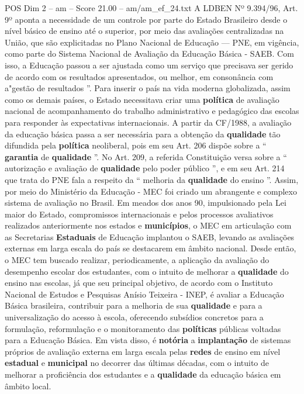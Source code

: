 \begin{textsample}{POS Dim 2 – am – Score 21.00 – am/am\_ef\_24.txt}
A LDBEN Nº 9.394/96, Art. 9º aponta a necessidade de um controle por parte do Estado Brasileiro desde o nível básico de ensino até o superior, por meio das avaliações centralizadas na União, que são explicitadas no Plano Nacional de Educação — PNE, em vigência, como parte do Sistema Nacional de Avaliação da Educação Básica - SAEB.
Com isso, a Educação passou a ser ajustada como um serviço que precisava ser gerido de acordo com os resultados apresentados, ou melhor, em consonância com a"gestão de resultados ”.
Para inserir o país na vida moderna globalizada, assim como os demais países, o Estado necessitava criar uma \textbf{política} de avaliação nacional de acompanhamento do trabalho administrativo e pedagógico das escolas para responder às expectativas internacionais.
A partir da CF/1988, a avaliação da educação básica passa a ser necessária para a obtenção da \textbf{qualidade} tão difundida pela \textbf{política} neoliberal, pois em seu Art. 206 dispõe sobre a “ \textbf{garantia} de \textbf{qualidade} ”.
No Art. 209, a referida Constituição versa sobre a “ autorização e avaliação de \textbf{qualidade} pelo poder público ”, e em seu Art. 214 que trata do PNE fala a respeito da “ melhoria da \textbf{qualidade} do ensino ”.
Assim, por meio do Ministério da Educação - MEC foi criado um abrangente e complexo sistema de avaliação no Brasil.
Em meados dos anos 90, impulsionado pela Lei maior do Estado, compromissos internacionais e pelos processos avaliativos realizados anteriormente nos estados e \textbf{municípios}, o MEC em articulação com as Secretarias \textbf{Estaduais} de Educação implantou o SAEB, levando as avaliações externas em larga escala do país se destacarem em âmbito nacional.
Desde então, o MEC tem buscado realizar, periodicamente, a aplicação da avaliação do desempenho escolar dos estudantes, com o intuito de melhorar a \textbf{qualidade} do ensino nas escolas, já que seu principal objetivo, de acordo com o Instituto Nacional de Estudos e Pesquisas Anísio Teixeira - INEP, é avaliar a Educação Básica brasileira, contribuir para a melhoria de sua \textbf{qualidade} e para a universalização do acesso à escola, oferecendo subsídios concretos para a formulação, reformulação e o monitoramento das \textbf{políticas} públicas voltadas para a Educação Básica.
Em vista disso, é \textbf{notória} a \textbf{implantação} de sistemas próprios de avaliação externa em larga escala pelas \textbf{redes} de ensino em nível \textbf{estadual} e \textbf{municipal} no decorrer das últimas décadas, com o intuito de melhorar a proficiência dos estudantes e a \textbf{qualidade} da educação básica em âmbito local.

\end{textsample}
